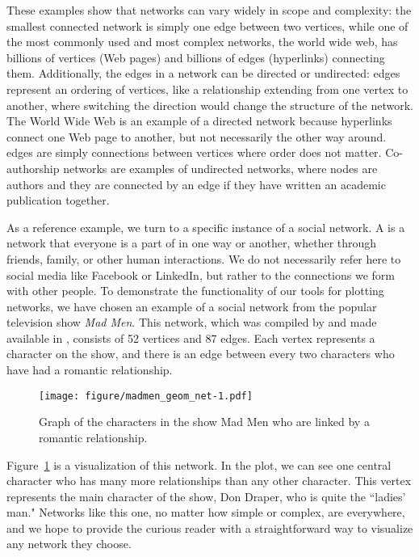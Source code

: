 These examples show that networks can vary widely in scope and complexity: the smallest connected network is simply one edge between two vertices, while one of the most commonly used and most complex networks, the world wide web, has billions of vertices (Web pages) and billions of edges (hyperlinks) connecting them. Additionally, the edges in a network can be directed or undirected:  edges represent an ordering of vertices, like a relationship extending from one vertex to another, where switching the direction would change the structure of the network. The World Wide Web is an example of a directed network because hyperlinks connect one Web page to another, but not necessarily the other way around.  edges are simply connections between vertices where order does not matter. Co-authorship networks are examples of undirected networks, where nodes are authors and they are connected by an edge if they have written an academic publication together.

As a reference example, we turn to a specific instance of a social network. A  is a network that everyone is a part of in one way or another, whether through friends, family, or other human interactions. We do not necessarily refer here to social media like Facebook or LinkedIn, but rather to the connections we form with other people. To demonstrate the functionality of our tools for plotting networks, we have chosen an example of a social network from the popular television show \emph{Mad Men}. This network, which was compiled by \citet{madmen} and made available in  \citep{gcookbook}, consists of 52 vertices and 87 edges. Each vertex represents a character on the show, and there is an edge between every two characters who have had a romantic relationship.

\begin{figure}[hbtp]
\centering

\texttt{[image: figure/madmen\_geom\_net-1.pdf]}
\caption{\label{fig.cap:madmen} Graph of the characters in the show Mad Men who are linked by a romantic relationship. }
\end{figure}

Figure~\ref{fig.cap:madmen} is a visualization of this network. In the plot, we can see one central character who has many more relationships than any other character. This vertex represents the main character of the show, Don Draper, who is quite the ``ladies' man." Networks like this one, no matter how simple or complex, are everywhere, and we hope to provide the curious reader with a straightforward way to visualize any network they choose.

